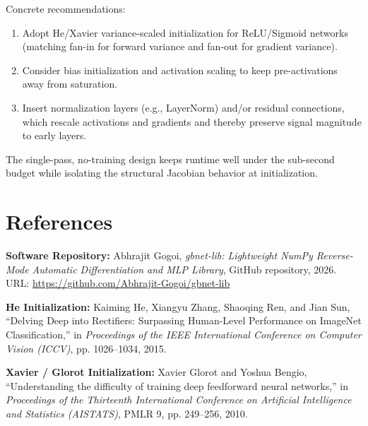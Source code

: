\documentclass[11pt,a4paper]{article}
\begin{document}
Concrete recommendations:
\begin{enumerate}
\item Adopt He/Xavier variance-scaled initialization for ReLU/Sigmoid networks (matching fan-in for forward variance and fan-out for gradient variance).
\item Consider bias initialization and activation scaling to keep pre-activations away from saturation.
\item Insert normalization layers (e.g., LayerNorm) and/or residual connections, which rescale activations and gradients and thereby preserve signal magnitude to early layers.
\end{enumerate}

The single-pass, no-training design keeps runtime well under the sub-second budget while isolating the structural Jacobian behavior at initialization.

\section*{References}

\noindent
\textbf{Software Repository:} Abhrajit Gogoi, \textit{gbnet-lib: Lightweight NumPy Reverse-Mode Automatic Differentiation and MLP Library}, GitHub repository, 2026. URL: \url{https://github.com/Abhrajit-Gogoi/gbnet-lib}

\noindent
\textbf{He Initialization:} Kaiming He, Xiangyu Zhang, Shaoqing Ren, and Jian Sun, ``Delving Deep into Rectifiers: Surpassing Human-Level Performance on ImageNet Classification,'' in \textit{Proceedings of the IEEE International Conference on Computer Vision (ICCV)}, pp. 1026--1034, 2015.

\noindent
\textbf{Xavier / Glorot Initialization:} Xavier Glorot and Yoshua Bengio, ``Understanding the difficulty of training deep feedforward neural networks,'' in \textit{Proceedings of the Thirteenth International Conference on Artificial Intelligence and Statistics (AISTATS)}, PMLR 9, pp. 249--256, 2010.
\end{document}
